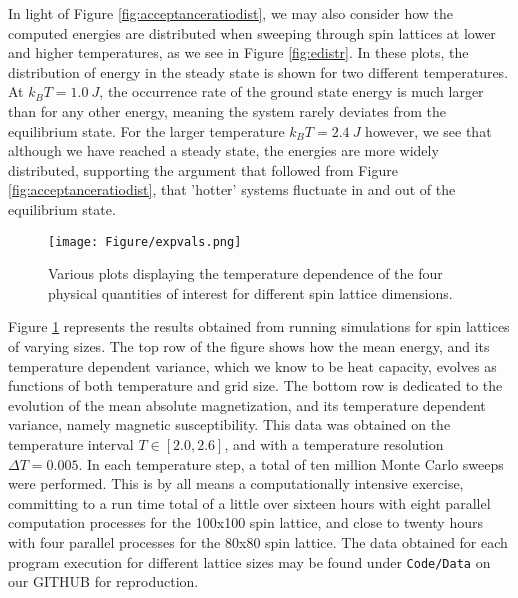 In light of Figure \ref{fig:acceptanceratiodist}, we may also consider how the computed energies are distributed when sweeping through spin lattices at lower and higher temperatures, as we see in Figure \ref{fig:edistr}. In these plots, the distribution of energy in the steady state is shown for two different temperatures. At $k_B T = 1.0 \ J$, the occurrence rate of the ground state energy is much larger than for any other energy, meaning the system rarely deviates from the equilibrium state. For the larger temperature $k_B T = 2.4\ J$ however, we see that although we have reached a steady state, the energies are more widely distributed, supporting the argument that followed from Figure \ref{fig:acceptanceratiodist}, that 'hotter' systems fluctuate in and out of the equilibrium state.\\

\begin{figure}[H]
    \centering
    \texttt{[image: Figure/expvals.png]}
    \caption{Various plots displaying the temperature dependence of the four physical quantities of interest for different spin lattice dimensions. }
    \label{fig:expvals}
\end{figure}

Figure \ref{fig:expvals} represents the results obtained from running simulations for spin lattices of varying sizes. The top row of the figure shows how the mean energy, and its temperature dependent variance, which we know to be heat capacity, evolves as functions of both temperature and grid size. The bottom row is dedicated to the evolution of the mean absolute magnetization, and its temperature dependent variance, namely magnetic susceptibility. This data was obtained on the temperature interval $T \in [2.0,2.6]$, and with a temperature resolution $\Delta T = 0.005$. In each temperature step, a total of ten million Monte Carlo sweeps were performed. This is by all means a computationally intensive exercise, committing to a run time total of a little over sixteen hours with eight parallel computation processes for the 100x100 spin lattice, and close to twenty hours with four parallel processes for the 80x80 spin lattice. The data obtained for each program execution for different lattice sizes may be found under \texttt{Code/Data} on our GITHUB for reproduction.\\

